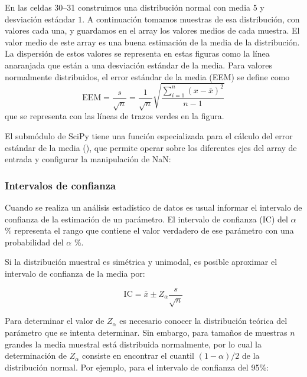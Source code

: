 En las celdas 30--31 construimos una distribución normal con media $5$ y desviación estándar $1$. A continuación tomamos  muestras de esa distribución, con  valores cada una, y guardamos en el array  los valores medios de cada muestra. El valor medio de este array es una buena estimación de la media de la distribución. La dispersión de estos valores se representa en estas figuras como la línea anaranjada que están a una desviación estándar de la media. Para valores normalmente distribuidos, el error estándar de la media (EEM) se define como
\begin{equation}
 \text{EEM} = \frac{s}{\sqrt{n}} = \frac{1}{\sqrt{n}} \sqrt{\frac{\sum_{i=1}^n (x - \bar{x})^2}{n-1}}
\end{equation} 
que se representa con las líneas de trazos verdes en la figura.


El submódulo  de SciPy tiene una función especializada para el cálculo del error estándar de la media (), que permite operar sobre los diferentes ejes del array de entrada y configurar la manipulación de NaN:


\subsubsection{Intervalos de confianza}

Cuando se realiza un análisis estadístico de datos es usual informar el intervalo de confianza de la estimación de un parámetro. El intervalo de confianza (IC) del $\alpha$\% representa el rango que contiene el valor verdadero de ese parámetro con una probabilidad del $\alpha$ \%.

Si la distribución muestral es simétrica y unimodal, es posible aproximar el intervalo de confianza de la media por:

\[ \text{IC} = \bar{x} \pm Z_{\alpha} \frac{s}{\sqrt{n}}  \]

Para determinar el valor de $Z_{\alpha}$ es necesario conocer la distribución teórica del parámetro que se intenta determinar. Sin embargo, para tamaños de muestras $n$ grandes la media muestral está distribuida normalmente, por lo cual la determinación de $Z_{\alpha}$ consiste en encontrar el cuantil $(1-\alpha)/2$ de la distribución normal. Por ejemplo, para el intervalo de confianza del 95\%:

